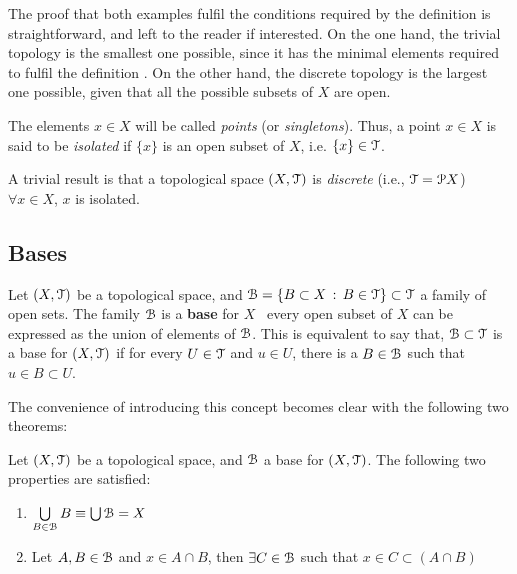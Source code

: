 The proof that both examples fulfil the conditions required by the definition
 is straightforward, and left to the reader if interested.
On the one hand, the trivial topology is the smallest one possible, since it has the
minimal elements required to fulfil the definition .
On the other hand, the discrete topology is the largest one possible, given that all
the possible subsets of $X$ are open.

\begin{definition}
	The elements $x\in X$ will be called \emph{points} (or \emph{singletons}).
	Thus, a point $x\in X$ is said to be \emph{isolated} if $\{x\}$ is an open subset
	of $X$, i.e. $\{x\}\in \EuScript{T}$.
\end{definition}

\begin{remark}
	A trivial result is that a topological space $(X,\EuScript{T})$ is \emph{discrete} (i.e.,
	$\EuScript{T}=\EuScript{P} X$) \iff\ $\forall x\in X$, $x$ is isolated.
\end{remark}

\subsection{Bases}\label{subsec:bases}

\begin{definition}
	Let $(X, \EuScript{T})$ be a topological space, and $\EuScript{B} = \{B \subset X\,:\, B \in \EuScript{T}\}\subset\EuScript{T}$
	a family of open sets.
	The family $\EuScript{B}$ is a \textbf{base} for $X$ \iff\, every open subset of $X$ can be
	expressed as the union of elements of $\EuScript{B}$.
	This is equivalent to say that, $\EuScript{B}\subset\EuScript{T}$ is a base for $(X,\EuScript{T})$ if for every $U\in\EuScript{T}$ and $u\in U$, there is a $B\in \EuScript{B}$ such that
	$u\in B\subset U$.
	\label{def:base}
\end{definition}

The convenience of introducing this concept becomes clear with the following two theorems:

\begin{theorem}
	Let $(X, \EuScript{T})$ be a topological space, and $\EuScript{B}$ a base for $(X, \EuScript{T})$.
	The following two properties are satisfied:
	\begin{enumerate}
		\item $\bigcup\limits_{B\in\EuScript{B}} B \equiv \bigcup\EuScript{B} = X$
		\item Let $A, B\in \EuScript{B}$ and $x\in A\cap B$, then $\exists C\in \EuScript{B}$ such
		that $x\in C\subset (A\cap B)$
	\end{enumerate}
\end{theorem}

